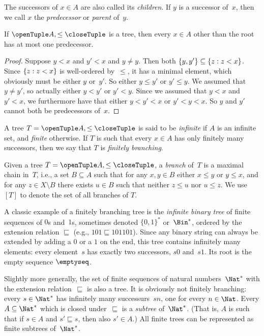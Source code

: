 \documentclass[../../../include/open-logic-section]{subfiles}
\begin{document}
The successors of $x \in A$ are also called its \emph{children}. If
$y$ is a successor of~$x$, then we call $x$ the \emph{predecessor} or
\emph{parent} of~$y$.

\begin{prop}
If $\tuple{A,\le}$ is a tree, then every $x \in A$ other than the root
has at most one predecessor.
\end{prop}

\begin{proof}
  Suppose $y < x$ and $y' < x$ and $y \neq y$. Then both $\{y,
  y'\} \subseteq \{ z : z<x \}$. Since $\{ z : z<x \}$ is
  well-ordered by~$\le$, it has a minimal element, which obviously
  must be either $y$ or~$y'$. So either $y \le y'$ or $y' \le y$. We
  assumed that $y \neq y'$, so actually either $y < y'$ or $y' < y$.
  Since we assumed that $y < x$ and $y' < x$, we furthermore have that
  either $y < y' < x$ or $y' < y < x$. So $y$ and $y'$ cannot both be
  predecessors of~$x$.
\end{proof}

\begin{defn}
A tree $T = \tuple{A, \le}$ is said to be \emph{infinite} if $A$ is an
infinite set, and \emph{finite} otherwise. If $T$ is such that every
$x \in A$ has only finitely many successors, then we say that $T$ is
\emph{finitely branching}.
\end{defn}

\begin{defn}[Branches]
Given a tree $T = \tuple{A, \le}$, a \emph{branch} of~$T$ is a
maximal chain in~$T$, i.e., a set $B \subseteq A$ such that
for any $x, y \in B$ either $x \le y$ or $y \le x$, and for any
$z \in X \setminus B$ there exists $u \in B$ such that neither
$z \le u$ nor $u \le z$.
%
We use $[T]$ to denote the set of all branches of $T$.
\end{defn}

\begin{ex}
A classic example of a finitely branching tree is the
\emph{infinite binary tree} of finite sequences of $0$s and~$1$s,
sometimes denoted $\{0,1\}^*$ or~$\Bin^*$, ordered by the extension
relation $\sqsubseteq$ (e.g., $101 \sqsubseteq 101101$).
Since any binary string can always be extended by adding
a $0$ or a $1$ on the end, this tree contains infinitely
many elements: every element~$s$ has exactly two successors, $s0$ and~$s1$. Its root is the empty sequence $\emptyseq$.
\end{ex}

\begin{ex}
Slightly more generally, the set of finite sequences of natural
numbers~$\Nat^*$ with the extension relation~$\sqsubseteq$ is also a
tree. It is obviously not finitely branching: every $s \in \Nat^*$ has
infinitely many successurs~$sn$, one for every $n \in \Nat$. Every $A
\subseteq \Nat^*$ which is closed under~$\sqsubseteq$ is a
\emph{subtree} of~$\Nat^*$. (That is, $A$ is such that if $s \in A$
and $s' \sqsubseteq s$, then also $s' \in A$.) All finite trees can be
represented as finite subtrees of~$\Nat^*$.
\end{ex}
\end{document}
